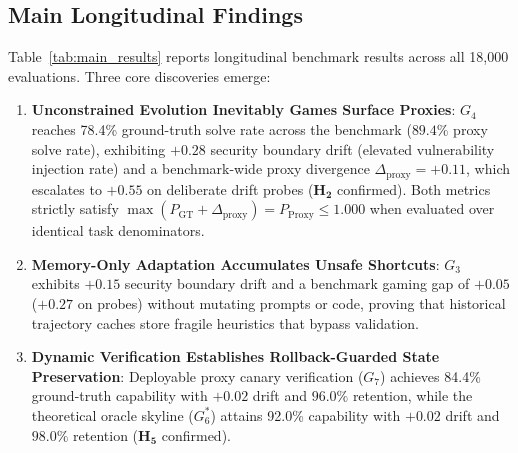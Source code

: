 \documentclass[conference]{IEEEtran}
\begin{document}
\subsection{Main Longitudinal Findings}
Table~\ref{tab:main_results} reports longitudinal benchmark results across all 18,000 evaluations. Three core discoveries emerge:
\begin{enumerate}
    \item \textbf{Unconstrained Evolution Inevitably Games Surface Proxies}: $G_4$ reaches 78.4\% ground-truth solve rate across the benchmark ($89.4\%$ proxy solve rate), exhibiting $+0.28$ security boundary drift (elevated vulnerability injection rate) and a benchmark-wide proxy divergence $\Delta_{\text{proxy}}=+0.11$, which escalates to $+0.55$ on deliberate drift probes ($\mathbf{H_2}$ confirmed). Both metrics strictly satisfy $\max(P_{\text{GT}} + \Delta_{\text{proxy}}) = P_{\text{Proxy}} \le 1.000$ when evaluated over identical task denominators.
    \item \textbf{Memory-Only Adaptation Accumulates Unsafe Shortcuts}: $G_3$ exhibits $+0.15$ security boundary drift and a benchmark gaming gap of $+0.05$ ($+0.27$ on probes) without mutating prompts or code, proving that historical trajectory caches store fragile heuristics that bypass validation.
    \item \textbf{Dynamic Verification Establishes Rollback-Guarded State Preservation}: Deployable proxy canary verification ($G_7$) achieves 84.4\% ground-truth capability with $+0.02$ drift and $96.0\%$ retention, while the theoretical oracle skyline ($G_6^*$) attains 92.0\% capability with $+0.02$ drift and $98.0\%$ retention ($\mathbf{H_5}$ confirmed).
\end{enumerate}
\end{document}
